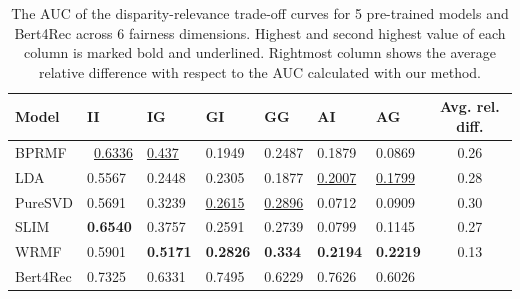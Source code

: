 \begin{table}[ht]
    \centering
    \begin{tabular}{lllllllc}
        \hline
        \textbf{Model} & \textbf{II} & \textbf{IG} & \textbf{GI} & \textbf{GG} & \textbf{AI} & \textbf{AG} & \textbf{Avg. rel. diff.}\\ 
        \hline
        BPRMF  &  \ \underline{0.6336} & \underline{0.437} & 0.1949 &  0.2487  &  0.1879  & 0.0869 & 0.26 \\
        LDA  &  0.5567 & 0.2448  & 0.2305  &  0.1877  & \underline{0.2007}   & \underline{0.1799}  & 0.28\\ 
        PureSVD  &  0.5691  &  0.3239  &  \underline{0.2615}  & \underline{0.2896}  & 0.0712  &  0.0909  & 0.30\\ 
        SLIM  &  \textbf{0.6540}  &  0.3757  &  0.2591  &  0.2739  &  0.0799  &  0.1145 & 0.27 \\ 
        WRMF  &  0.5901  &  \textbf{0.5171}  &  \textbf{0.2826} &  \textbf{0.334}  &  \textbf{0.2194}   &  \textbf{0.2219}  & 0.13\\ 
        Bert4Rec & 0.7325 & 0.6331 & 0.7495 &  0.6229  & 0.7626  & 0.6026 &\\ 
        \hline
    \end{tabular}
    \caption{\label{auc}
    The AUC of the disparity-relevance trade-off curves for 5 pre-trained models and Bert4Rec across 6 fairness dimensions. Highest and second highest value of each column is marked bold and underlined. Rightmost column shows the average relative difference with respect to the AUC calculated with our method.}
    \vspace{-4mm}
\end{table}
